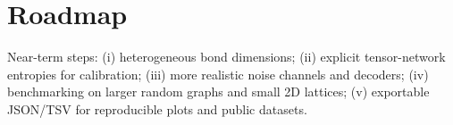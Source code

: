 \documentclass[11pt]{article}
\begin{document}
\section{Roadmap}
Near-term steps:
(i) heterogeneous bond dimensions; (ii) explicit tensor-network entropies for calibration; (iii) more realistic noise channels and decoders; (iv) benchmarking on larger random graphs and small 2D lattices; (v) exportable JSON/TSV for reproducible plots and public datasets.
\end{document}
